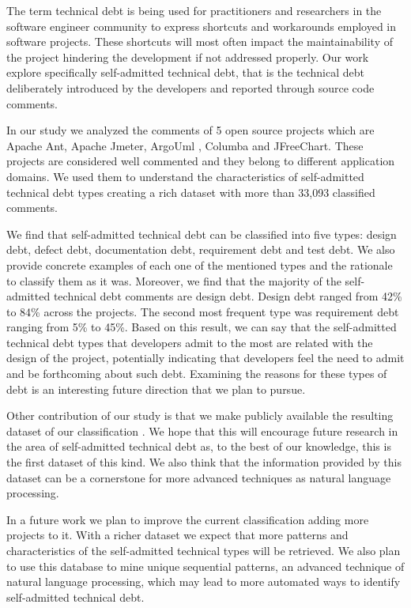 The term technical debt is being used for practitioners and researchers in the software engineer community to express shortcuts and workarounds employed in software projects. These shortcuts will most often impact the maintainability of the project hindering the development if not addressed properly. Our work explore specifically self-admitted technical debt, that is the technical debt deliberately introduced by the developers and reported through source code comments.

In our study we analyzed the comments of 5 open source projects which are Apache Ant, Apache Jmeter, ArgoUml , Columba and JFreeChart. These projects are considered well commented and they belong to different application domains. We used them to understand the characteristics of self-admitted technical debt types creating a rich dataset with more than 33,093 classified comments.


We find that self-admitted technical debt can be classified into five types: design debt, defect debt, documentation debt, requirement debt and test debt. We also provide concrete examples of each one of the mentioned types and the rationale to classify them as it was. Moreover, we find that the majority of the self-admitted technical debt comments are design debt. Design debt ranged from 42\% to 84\% across the projects. The second most frequent type was requirement debt ranging from 5\% to 45\%. Based on this result, we can say that the self-admitted technical debt types that developers admit to the most are related with the design of the project, potentially indicating that developers feel the need to admit and be forthcoming about such debt. Examining the reasons for these types of debt is an interesting future direction that we plan to pursue.

Other contribution of our study is that we make publicly available the resulting dataset of our classification . We hope that this will encourage future research in the area of self-admitted technical debt as, to the best of our knowledge, this is the first dataset of this kind. We also think that the information provided by this dataset can be a cornerstone for more advanced techniques as natural language processing.   

In a future work we plan to improve the current classification adding more projects to it. With a richer dataset we expect that more patterns and characteristics of the self-admitted technical types will be retrieved. We also plan to use this database to mine unique sequential patterns, an advanced technique of natural language processing, which may lead to more automated ways to identify self-admitted technical debt. 
